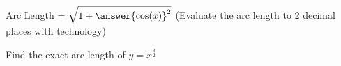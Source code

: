 \documentclass{ximera}
\begin{document}
\begin{problem}

Arc Length = $\sqrt{1+{\answer{\cos(x)}^2}}$ (Evaluate the arc length to 2 decimal places with technology)
\end{problem}

\begin{problem}
Find the exact arc length of $y = x^{\frac{3}{2}}$ 

\end{problem}
\end{document}
